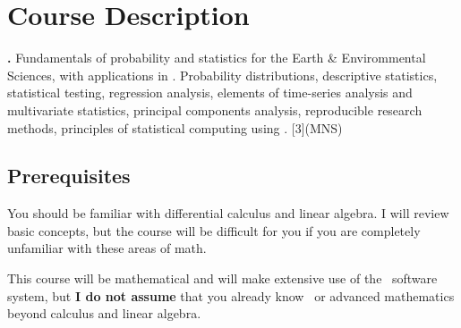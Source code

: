 \documentclass[11pt,twoside]{jgsyllabus}\usepackage[]{graphicx}\usepackage[]{xcolor}
\begin{document}
\medskip
\section[Description]{Course Description}

\textbf{\ShortCourseName.}
Fundamentals of probability and statistics for the Earth \& Envirommental
Sciences, with applications in \Rstats. Probability distributions, descriptive
statistics, statistical testing, regression analysis, elements of time-series
analysis and multivariate statistics, principal components analysis,
reproducible research methods, principles of statistical computing using \Rstats.
[3](MNS)

\subsection{Prerequisites}

You should be familiar with differential calculus and linear algebra.
I will review basic concepts, but the course will be difficult for you if you
are completely unfamiliar with these areas of math.

This course will be mathematical and will make extensive use of the \Rstats\
software system, but
\textbf{I do not assume} that you already know \Rstats\ or advanced
mathematics beyond calculus and linear algebra.

\iftrue
\end{document}
